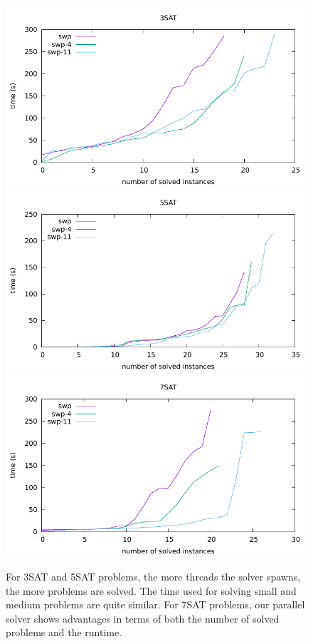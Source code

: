 \documentclass[12pt,a4paper,twoside]{scrartcl}
\numberwithin{equation}{section}
\begin{document}
 \begin{figure}[H]
\begin{center}
  \includegraphics[scale = 1]{Parallel/K3/e2.pdf}
    \includegraphics[scale = 1]{Parallel/K5/e2.pdf}
  \includegraphics[scale = 1]{Parallel/K7/e2.pdf}
  \end{center}
  \caption{For 3SAT and 5SAT problems, the more threads the solver spawns, the more problems are solved. The time used for solving small and medium problems are quite similar. For 7SAT problems, our parallel solver shows advantages in terms of both the number of solved problems and the runtime.}
  \label{Experiment 6 COMBINE}
  \end{figure}
\clearpage
\end{document}
